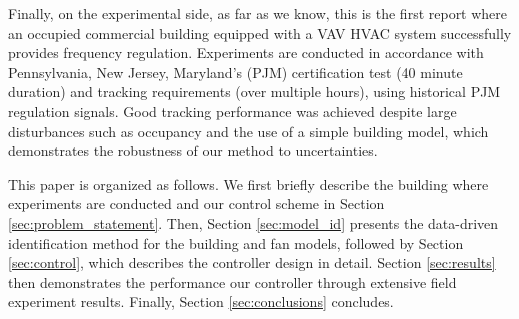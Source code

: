 \documentclass[../thesis.tex]{subfiles}
\begin{document}
Finally, on the experimental side, as far as we know, this is the first report where an occupied commercial building equipped with a VAV HVAC system successfully provides frequency regulation.
Experiments are conducted in accordance with Pennsylvania, New Jersey, Maryland's (PJM) certification test (40 minute duration) and tracking requirements (over multiple hours), using historical PJM regulation signals.  
Good tracking performance was achieved despite large disturbances such as occupancy and the use of a simple building model, which demonstrates the robustness of our method to uncertainties.

This paper is organized as follows. We first briefly describe the building where experiments are conducted and our control scheme in Section \ref{sec:problem_statement}. Then, Section \ref{sec:model_id} presents the data-driven identification method for the building and fan models, followed by Section \ref{sec:control}, which describes the controller design in detail. Section \ref{sec:results} then demonstrates the performance our controller through extensive field experiment results.
Finally, Section \ref{sec:conclusions} concludes.
\end{document}
